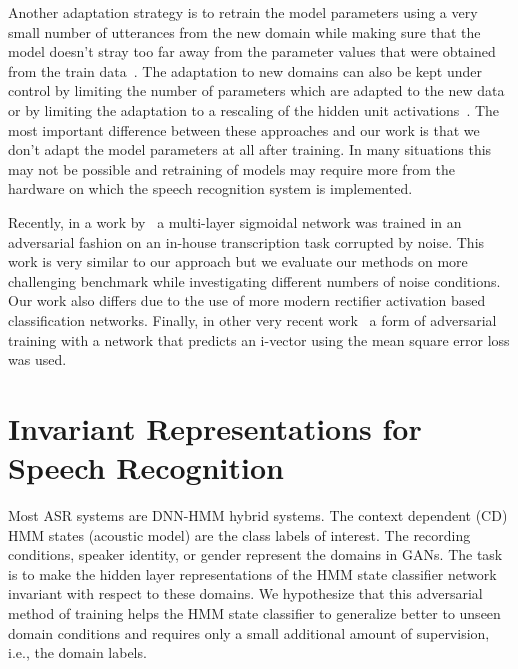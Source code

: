 \documentclass[a4paper]{article}
\begin{document}
    Another adaptation strategy is to retrain the model parameters using a very small
    number of utterances from the new domain while making sure that the model
    doesn't stray too far away from the parameter values that were obtained from
    the train data~\citep{yu2013kl}.
    The adaptation to new domains can also be kept under control by limiting
    the number of parameters which are adapted to the new data or by limiting the
    adaptation to a rescaling of the hidden unit activations~\citep{swietojanski2014learning}.
    The most important difference between these approaches and our work is that
    we don't adapt the model parameters at all after training. In many
    situations this may not be possible and retraining of models may require more
    from the hardware on which the speech recognition system is implemented.

    Recently, in a work by~\cite{yusuke2016adversarial} a multi-layer sigmoidal network was trained 
    in an adversarial fashion on an in-house transcription task corrupted by noise.
    This work is very similar to our approach but we evaluate our methods on
    more challenging benchmark while investigating different numbers of noise
    conditions. Our work also differs due to the use of more modern rectifier
    activation based classification networks.
    Finally, in other very recent work~\citep{saon2017english} a form of adversarial training with a network
    that predicts an i-vector using the mean square error loss was used.

\section{Invariant Representations for Speech Recognition}
\label{sec:invariant-speech}

Most ASR systems are DNN-HMM hybrid systems. The context dependent (CD) HMM 
states (acoustic model) are the class labels of interest. The
recording conditions, speaker identity, or gender represent the domains in 
GANs. The task is to make the hidden layer representations of the HMM state classifier network 
invariant with respect to these domains. We hypothesize that this adversarial method of
training helps the HMM state classifier to generalize better to unseen domain conditions and requires only a  
small additional amount of supervision, i.e., the domain labels.  
\end{document}
